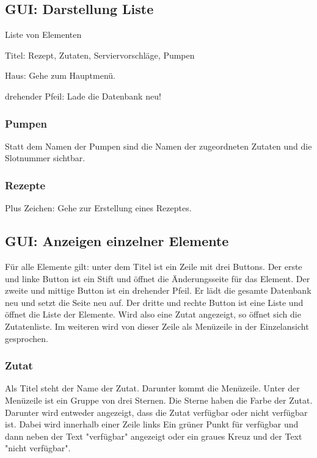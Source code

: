 \subsection{GUI: Darstellung Liste}
Liste von Elementen

Titel: Rezept, Zutaten, Serviervorschläge, Pumpen

Haus: Gehe zum Hauptmenü.

drehender Pfeil: Lade die Datenbank neu!

\subsubsection{Pumpen}

Statt dem Namen der Pumpen sind die Namen der zugeordneten Zutaten und die Slotnummer sichtbar.

\subsubsection{Rezepte}

Plus Zeichen: Gehe zur Erstellung eines Rezeptes.

\subsection{GUI: Anzeigen einzelner Elemente}

Für alle Elemente gilt: unter dem Titel ist ein Zeile mit drei Buttons. Der erste und linke Button ist ein Stift und öffnet die Änderungsseite für das Element. Der zweite und mittige Button ist ein drehender Pfeil. Er lädt die gesamte Datenbank neu und setzt die Seite neu auf. Der dritte und rechte Button ist eine Liste und öffnet die Liste der Elemente. Wird also eine Zutat angezeigt, so öffnet sich die Zutatenliste. Im weiteren wird von dieser Zeile als Menüzeile in der Einzelansicht gesprochen.

\subsubsection{ Zutat}

Als Titel steht der Name der Zutat. Darunter kommt die Menüzeile. Unter der Menüzeile ist ein Gruppe von drei Sternen. Die Sterne haben die Farbe der Zutat. Darunter wird entweder angezeigt, dass die Zutat verfügbar oder nicht verfügbar ist. Dabei wird innerhalb einer Zeile links Ein grüner Punkt für verfügbar und dann neben der Text "verfügbar" angezeigt oder ein graues Kreuz und der Text "nicht verfügbar".

